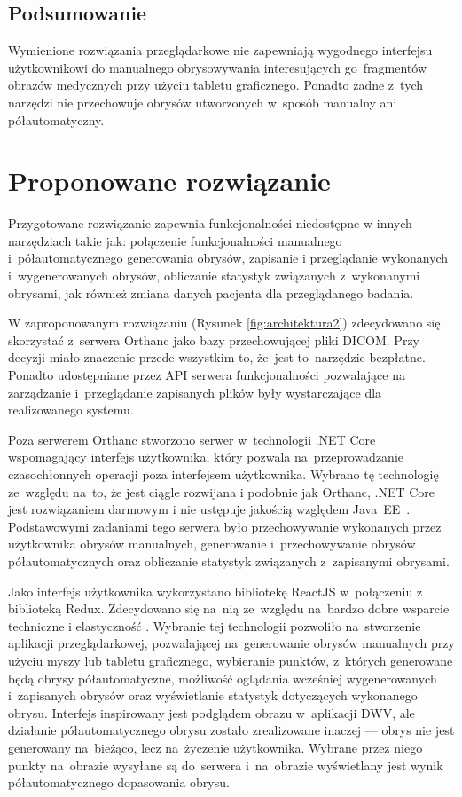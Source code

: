 \documentclass[a4paper,11pt,twoside,openright]{report}
\theoremstyle{definition}
\begin{document}
\subsection {Podsumowanie}

Wymienione rozwiązania przeglądarkowe nie zapewniają wygodnego interfejsu użytkownikowi
do manualnego obrysowywania interesujących go~fragmentów obrazów medycznych przy użyciu tabletu graficznego.
Ponadto żadne z~tych narzędzi nie przechowuje obrysów utworzonych w~sposób manualny
ani półautomatyczny.

\section {Proponowane rozwiązanie}

Przygotowane rozwiązanie zapewnia funkcjonalności niedostępne w innych narzędziach
takie jak: połączenie funkcjonalności manualnego i~półautomatycznego generowania obrysów,
zapisanie i przeglądanie wykonanych i~wygenerowanych obrysów,
obliczanie statystyk związanych z~wykonanymi obrysami, jak również zmiana danych pacjenta
dla przeglądanego badania.

W zaproponowanym rozwiązaniu (Rysunek \ref{fig:architektura2}) zdecydowano się skorzystać z~serwera Orthanc jako bazy przechowującej
pliki DICOM. Przy decyzji miało znaczenie przede wszystkim to, że~jest to~narzędzie
bezpłatne. Ponadto udostępniane przez API serwera funkcjonalności pozwalające na
zarządzanie i~przeglądanie zapisanych plików były wystarczające dla realizowanego systemu.

Poza serwerem Orthanc stworzono serwer w~technologii .NET Core \cite{Dotnet}
wspomagający interfejs użytkownika, który pozwala na~przeprowadzanie czasochłonnych
operacji poza interfejsem użytkownika. Wybrano tę technologię ze~względu na~to,
że jest ciągle rozwijana i podobnie jak Orthanc, .NET Core jest rozwiązaniem darmowym
i nie ustępuje jakością względem Java~EE~\cite{Dlaczego dotnet}.
Podstawowymi zadaniami tego serwera było przechowywanie
wykonanych przez użytkownika obrysów manualnych, generowanie i~przechowywanie
obrysów półautomatycznych oraz obliczanie statystyk związanych z~zapisanymi obrysami.

Jako interfejs użytkownika wykorzystano bibliotekę ReactJS \cite{React} w~połączeniu
z biblioteką Redux\cite{Redux}. Zdecydowano się na~nią ze~względu na~bardzo dobre wsparcie techniczne
i elastyczność \cite{Dlaczego react}. Wybranie tej technologii pozwoliło na~stworzenie
aplikacji przeglądarkowej, pozwalającej na~generowanie obrysów manualnych przy
użyciu myszy lub tabletu graficznego, wybieranie punktów, z~których generowane
będą obrysy półautomatyczne, możliwość oglądania wcześniej wygenerowanych i~zapisanych
obrysów oraz wyświetlanie statystyk dotyczących wykonanego obrysu. Interfejs
inspirowany jest podglądem obrazu w~aplikacji DWV, ale działanie półautomatycznego
obrysu zostało zrealizowane inaczej --- obrys nie jest generowany na~bieżąco, lecz na~życzenie
użytkownika. Wybrane przez niego punkty na~obrazie wysyłane są do~serwera i~na~obrazie wyświetlany jest
wynik półautomatycznego dopasowania obrysu.
\end{document}
